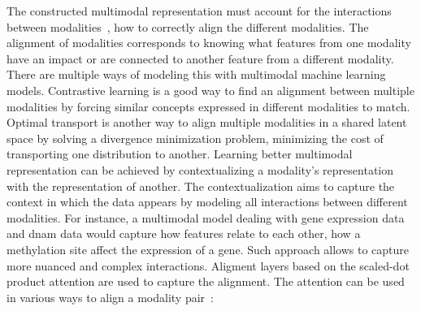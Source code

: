 \documentclass[../main.tex]{subfiles}
\begin{document}
	The constructed multimodal representation must account for the interactions between modalities~\cite{MML_morency}, \ie{}how to correctly align the different modalities.
	The alignment of modalities corresponds to knowing what features from one modality have an impact or are connected to another feature from a different modality.
	There are multiple ways of modeling this with multimodal machine learning models.
	Contrastive learning is a good way to find an alignment between multiple modalities by forcing similar concepts expressed in different modalities to match.
	Optimal transport is another way to align multiple modalities in a shared latent space by solving a divergence minimization problem, \ie{}minimizing the cost of transporting one distribution to another.
	Learning better multimodal representation can be achieved by contextualizing a modality's representation with the representation of another.
	The contextualization aims to capture the context in which the data appears by modeling all interactions between different modalities.
	For instance, a multimodal model dealing with gene expression data and \gls{dnam} data would capture how features relate to each other, \ie{}how a methylation site affect the expression of a gene.
	Such approach allows to capture more nuanced and complex interactions.
	Aligment layers based on the scaled-dot product attention are used to capture the alignment.
	The attention can be used in various ways to align a modality pair~\cite{Xu2023}:
\end{document}
